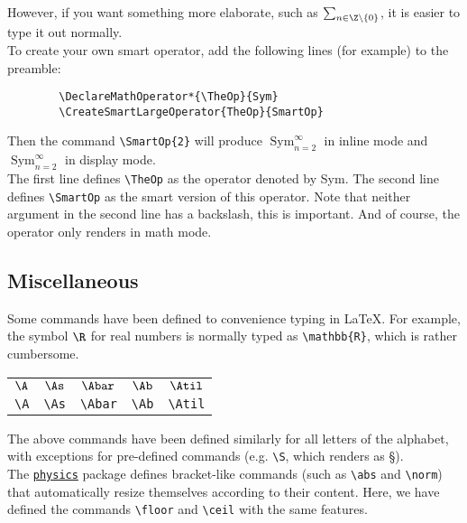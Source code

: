 \documentclass[10pt]{extarticle}
\makeatletter
\newcommand{\exc}{\backslash}
\newcommand{\<}{\langle}
\renewcommand{\>}{\rangle}
\theoremstyle{mystyle}{\newtheorem*{remark}{Remark}}
\theoremstyle{mystyle}{\newtheorem*{remarks}{Remarks}}
\theoremstyle{mystyle}{\newtheorem*{example}{Example}}
\theoremstyle{mystyle}{\newtheorem*{examples}{Examples}}
\theoremstyle{definition}{\newtheorem*{exercise}{Exercise}}
\theoremstyle{warn}
\newcommand*{\CreateSmartLargeOperator}[2]{
    \csdef{LargeOperator@#1@}{\csdef{LargeOperator@#1@Symbol}{\csuse{#1}}}
    \csdef{LargeOperator@#1@l}{\csdef{LargeOperator@#1@Symbol}{\csuse{#1}\limits}}
    \csdef{LargeOperator@#1@n}{\csdef{LargeOperator@#1@Symbol}{\csuse{#1}\nolimits}}
    \csdef{LargeOperator@#1@i}{\csdef{LargeOperator@#1@Symbol}{\textstyle\csuse{#1}}}
    \csdef{LargeOperator@#1@d}{\csdef{LargeOperator@#1@Symbol}{\displaystyle\csuse{#1}}}
    \csdef{LargeOperator@#1@il}{\csdef{LargeOperator@#1@Symbol}{\textstyle\csuse{#1}\limits}}
    \csdef{LargeOperator@#1@in}{\csdef{LargeOperator@#1@Symbol}{\textstyle\csuse{#1}\nolimits}}
    \csdef{LargeOperator@#1@dl}{\csdef{LargeOperator@#1@Symbol}{\displaystyle\csuse{#1}\limits}}
    \csdef{LargeOperator@#1@dn}{\csdef{LargeOperator@#1@Symbol}{\displaystyle\csuse{#1}\nolimits}}

\def\LargeOperatorSpecs@i##1,##2,##3,##4,##5,##6,##7\@nil{
    \ifx$##2$\csuse{LargeOperator@##1@Symbol}_{n=1}^{\infty}\else
        \ifx$##3$\csuse{LargeOperator@##1@Symbol}_{n=##2}^{\infty}\else
            \ifx$##4$\csuse{LargeOperator@##1@Symbol}_{n=##2}^{##3}\else
                \ifx$##5$\csuse{LargeOperator@##1@Symbol}_{##2=##3}^{##4}\else
                    \ifx$##6$\csuse{LargeOperator@##1@Symbol}_{##2,##3=##4}^{##5}\else
                        \csuse{LargeOperator@##1@Symbol}_{##2,##3,##4=##5}^{##6}
                    \fi
                \fi
            \fi
        \fi
    \fi
}

\expandafter\DeclareDocumentCommand\csname#2\endcsname{ O{} m }{ %
\bgroup %
    \expandafter\ifx\csname LargeOperator@#1@##1\endcsname\relax
    \expandafter\@gobble\else
    \csname LargeOperator@#1@##1\expandafter\endcsname
    \fi
    \expandafter\LargeOperatorSpecs@i#1,##2,,,,,\@nil%
\egroup}
}
\newcommand{\Disp}{\displaystyle}
\makeatother
\begin{document}
However, if you want something more elaborate, such as $\Disp\sum_{n\in\Z\exc\{0\}}$, it is easier to type it out normally.\\

To create your own smart operator, add the following lines (for example) to the preamble:

\begin{verbatim}
        \DeclareMathOperator*{\TheOp}{Sym}
        \CreateSmartLargeOperator{TheOp}{SmartOp}
\end{verbatim}

Then the command \verb!\SmartOp{2}! will produce $\operatorname*{Sym}_{n=2}^\infty$ in inline mode and $\Disp\operatorname*{Sym}_{n=2}^\infty$ in display mode.\\

The first line defines \verb!\TheOp! as the operator denoted by Sym. The second line defines \verb!\SmartOp! as the smart version of this operator. Note that neither argument in the second line has a backslash, this is important. And of course, the operator only renders in math mode.

\subsection{Miscellaneous}

Some commands have been defined to convenience typing in \LaTeX. For example, the symbol $\R$ for real numbers is normally typed as \verb!\mathbb{R}!, which is rather cumbersome.

\begin{center}
    \begin{tabular}{*{5}{c}} %
        $\A$ & $\As$ & $\Abar$ & $\Ab$ & $\Atil$ \\
        \verb!\A! & \verb!\As! & \verb!\Abar! & \verb!\Ab! & \verb!\Atil!
    \end{tabular}
\end{center}

The above commands have been defined similarly for all letters of the alphabet, with exceptions for pre-defined commands (e.g. \verb!\S!, which renders as \S).\\

The \href{https://ctan.org/pkg/physics}{\texttt{physics}} package defines bracket-like commands (such as \verb!\abs! and \verb!\norm!) that automatically resize themselves according to their content. Here, we have defined the commands \verb!\floor! and \verb!\ceil! with the same features.
\end{document}
